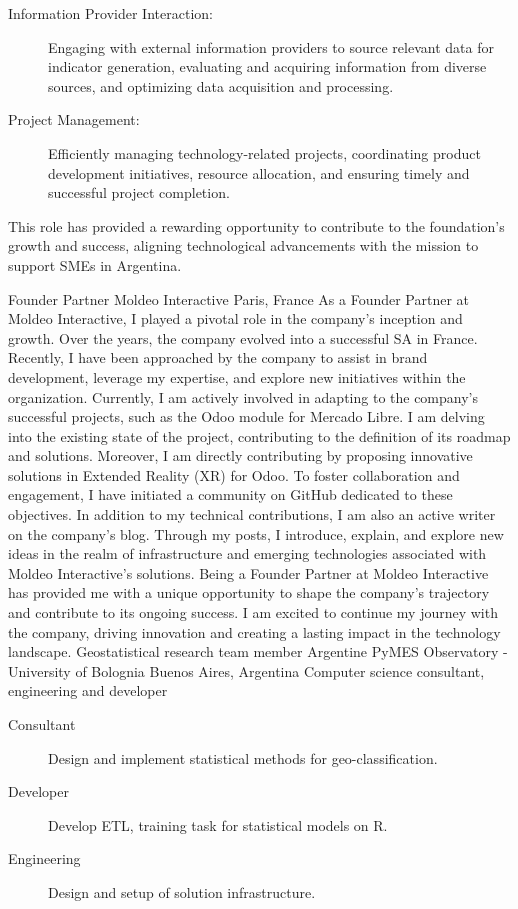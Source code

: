 \documentclass[9pt,a4paper,sans]{moderncv}
\newcommand{\actual}{$\infty$}
\begin{document}
{\begin{description}
        \item [Information Provider Interaction:] Engaging with external information providers to source relevant data for indicator generation, evaluating and acquiring information from diverse sources, and optimizing data acquisition and processing.
        \item [Project Management:] Efficiently managing technology-related projects, coordinating product development initiatives, resource allocation, and ensuring timely and successful project completion.
	\end{description}
This role has provided a rewarding opportunity to contribute to the foundation's growth and success, aligning technological advancements with the mission to support SMEs in Argentina.
	}
\cventry{2022-\actual}
	{Founder Partner}
	{Moldeo Interactive}
	{Paris, France}
	{}
	{
	As a Founder Partner at Moldeo Interactive, I played a pivotal role in the company's inception and growth.
	Over the years, the company evolved into a successful SA in France.
	Recently, I have been approached by the company to assist in brand development, leverage my expertise, and explore new initiatives within the organization.
	Currently, I am actively involved in adapting to the company's successful projects, such as the Odoo module for Mercado Libre.
	I am delving into the existing state of the project, contributing to the definition of its roadmap and solutions.
	Moreover, I am directly contributing by proposing innovative solutions in Extended Reality (XR) for Odoo.
	To foster collaboration and engagement, I have initiated a community on GitHub dedicated to these objectives.
	In addition to my technical contributions, I am also an active writer on the company's blog.
	Through my posts, I introduce, explain, and explore new ideas in the realm of infrastructure and emerging technologies associated with Moldeo Interactive's solutions.
	Being a Founder Partner at Moldeo Interactive has provided me with a unique opportunity to shape the company's trajectory and contribute to its ongoing success.
	I am excited to continue my journey with the company, driving innovation and creating a lasting impact in the technology landscape.
	}
\cventry{2012-\actual}
	{Geostatistical research team member}
	{Argentine PyMES Observatory - University of Bolognia}
	{Buenos Aires, Argentina}
	{Computer science consultant, engineering and developer}
	{\begin{description}
	 \item [Consultant] Design and implement statistical methods for geo-classification.
	 \item [Developer] Develop ETL, training task for statistical models on R.
	 \item [Engineering] Design and setup of solution infrastructure.
         \end{description}}
\end{document}
